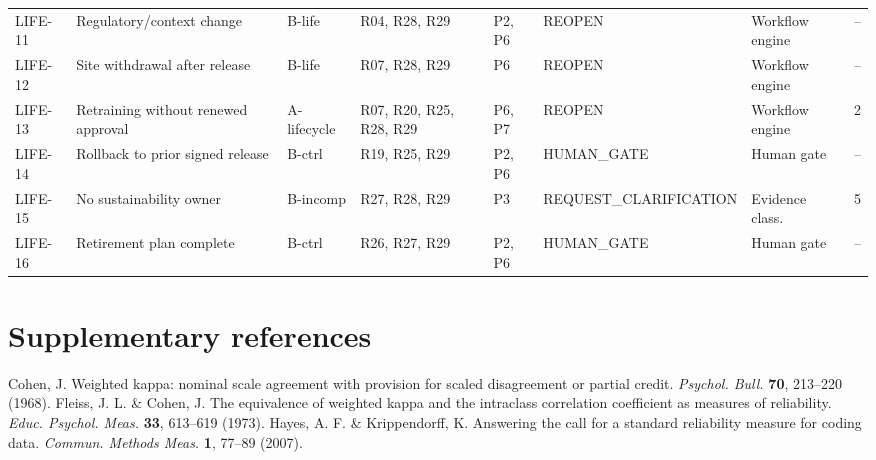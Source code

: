 \documentclass[10pt,a4paper]{article}
\begin{document}
\begin{landscape}
{\begin{longtable}{@{}p{1.5cm}p{5.2cm}p{1.5cm}p{2.4cm}p{1.9cm}p{2.7cm}p{2.2cm}c@{}}
LIFE-11 & Regulatory/context change & B-life & R04, R28, R29 & P2, P6 & REOPEN & Workflow engine & -- \\
LIFE-12 & Site withdrawal after release & B-life & R07, R28, R29 & P6 & REOPEN & Workflow engine & -- \\
LIFE-13 & Retraining without renewed approval & A-lifecycle & R07, R20, R25, R28, R29 & P6, P7 & REOPEN & Workflow engine & 2 \\
LIFE-14 & Rollback to prior signed release & B-ctrl & R19, R25, R29 & P2, P6 & HUMAN\_GATE & Human gate & -- \\
LIFE-15 & No sustainability owner & B-incomp & R27, R28, R29 & P3 & REQUEST\_CLARIFICATION & Evidence class. & 5 \\
LIFE-16 & Retirement plan complete & B-ctrl & R26, R27, R29 & P2, P6 & HUMAN\_GATE & Human gate & -- \\
\bottomrule
\end{longtable}}
\end{landscape}

\section{Supplementary references}

\begin{thebibliography}{9}
\footnotesize
{} Cohen, J. Weighted kappa: nominal scale agreement with provision for scaled disagreement or partial credit. \emph{Psychol. Bull.} \textbf{70}, 213--220 (1968).
 Fleiss, J. L. \& Cohen, J. The equivalence of weighted kappa and the intraclass correlation coefficient as measures of reliability. \emph{Educ. Psychol. Meas.} \textbf{33}, 613--619 (1973).
 Hayes, A. F. \& Krippendorff, K. Answering the call for a standard reliability measure for coding data. \emph{Commun. Methods Meas.} \textbf{1}, 77--89 (2007).
\end{thebibliography}
\end{document}
